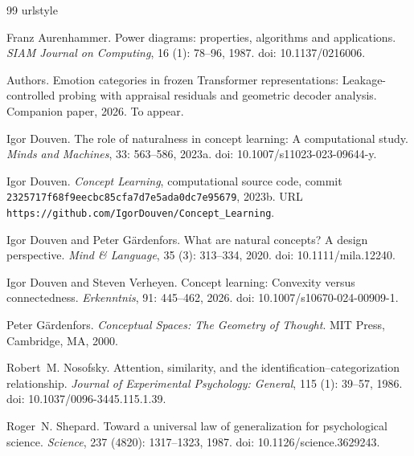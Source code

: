 \documentclass[11pt]{article}
\begin{document}
\begin{thebibliography}{99}
\providecommand{\natexlab}[1]{#1}
\providecommand{\url}[1]{\texttt{#1}}
\expandafter\ifx\csname urlstyle\endcsname\relax
  \providecommand{\doi}[1]{doi: #1}\else
  \providecommand{\doi}{doi: \begingroup \urlstyle{rm}\Url}\fi

Franz Aurenhammer.
\newblock Power diagrams: properties, algorithms and applications.
\newblock \emph{SIAM Journal on Computing}, 16 (1): 78--96,
  1987.
\newblock \doi{10.1137/0216006}.

Authors.
\newblock Emotion categories in frozen Transformer representations:
  Leakage-controlled probing with appraisal residuals and geometric decoder
  analysis.
\newblock Companion paper, 2026.
\newblock To appear.

\bibitem[Douven(2023{\natexlab{a}})]{douven-2023-naturalness}
Igor Douven.
\newblock The role of naturalness in concept learning: {A} computational study.
\newblock \emph{Minds and Machines}, 33: 563--586, 2023{\natexlab{a}}.
\newblock \doi{10.1007/s11023-023-09644-y}.

\bibitem[Douven(2023{\natexlab{b}})]{douven-code-2023}
Igor Douven.
\newblock \emph{Concept Learning}, computational source code, commit
  \texttt{2325717f68f9eecbc85cfa7d7e5ada0dc7e95679}, 2023{\natexlab{b}}.
\newblock URL \url{https://github.com/IgorDouven/Concept_Learning}.

Igor Douven and Peter G{\"a}rdenfors.
\newblock What are natural concepts? {A} design perspective.
\newblock \emph{Mind \& Language}, 35 (3): 313--334, 2020.
\newblock \doi{10.1111/mila.12240}.

Igor Douven and Steven Verheyen.
\newblock Concept learning: Convexity versus connectedness.
\newblock \emph{Erkenntnis}, 91: 445--462, 2026.
\newblock \doi{10.1007/s10670-024-00909-1}.

Peter G{\"a}rdenfors.
\newblock \emph{Conceptual Spaces: The Geometry of Thought}.
\newblock MIT Press, Cambridge, MA, 2000.

Robert~M. Nosofsky.
\newblock Attention, similarity, and the identification--categorization
  relationship.
\newblock \emph{Journal of Experimental Psychology: General}, 115
  (1): 39--57, 1986.
\newblock \doi{10.1037/0096-3445.115.1.39}.

Roger~N. Shepard.
\newblock Toward a universal law of generalization for psychological science.
\newblock \emph{Science}, 237 (4820): 1317--1323, 1987.
\newblock \doi{10.1126/science.3629243}.

\end{thebibliography}
\end{document}
